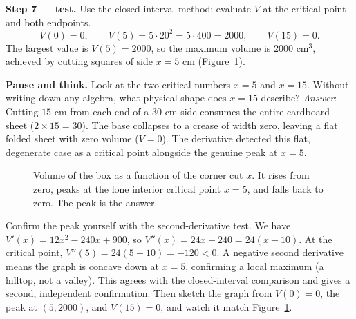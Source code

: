\textbf{Step 7 --- test.} Use the closed-interval method: evaluate $V$ at the
critical point and both endpoints.
\[
V(0)=0, \qquad V(5) = 5\cdot 20^2 = 5\cdot 400 = 2000, \qquad V(15)=0.
\]
The largest value is $V(5)=2000$, so the maximum volume is $\boxed{2000\text{ cm}^3}$,
achieved by cutting squares of side $\boxed{x=5\text{ cm}}$
(Figure~\ref{ch17:fig-box-volume}).

\begin{recoverybox}
\textbf{Pause and think.} Look at the two critical numbers $x=5$ and $x=15$. Without
writing down any algebra, what physical shape does $x=15$ describe?
\emph{Answer}: Cutting $15\text{ cm}$ from each end of a $30\text{ cm}$ side consumes
the entire cardboard sheet ($2 \times 15 = 30$). The base collapses to a crease of
width zero, leaving a flat folded sheet with zero volume ($V=0$). The derivative
detected this flat, degenerate case as a critical point alongside the
genuine peak at $x=5$.
\end{recoverybox}

\begin{figure}[H]
\centering
{}
\caption{Volume of the box as a function of the corner cut $x$. It rises from zero,
peaks at the lone interior critical point $x=5$, and falls back to zero. The peak is
the answer.}
\label{ch17:fig-box-volume}
\end{figure}

\begin{labbox}
Confirm the peak yourself with the second-derivative test. We have $V'(x)=12x^2-240x
+900$, so $V''(x)=24x-240=24(x-10)$. At the critical point, $V''(5)=24(5-10)=-120<0$.
A negative second derivative means the graph is concave down at $x=5$, confirming a
local maximum (a hilltop, not a valley). This agrees with the
closed-interval comparison and gives a second, independent confirmation. Then sketch
the graph from $V(0)=0$, the peak at $(5,2000)$, and $V(15)=0$, and watch it match
Figure~\ref{ch17:fig-box-volume}.
\end{labbox}

